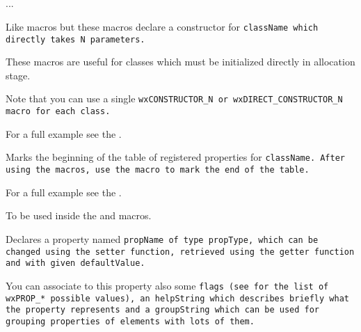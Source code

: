 \\
\\
\\
\\
...\\

Like  macros but these macros declare a constructor
for \tt{className} which directly takes \tt{N} parameters.

These macros are useful for classes which must be initialized directly in allocation stage.

Note that you can use a single \tt{wxCONSTRUCTOR\_N} or \tt{wxDIRECT\_CONSTRUCTOR\_N} macro
for each class.

For a full example see the .


\label{wxbeginpropertiestable}


Marks the beginning of the table of registered properties for \tt{className}.
After using the  macros, use the
 macro 
to mark the end of the table.

For a full example see the .


\label{wxproperty}


To be used inside the 
and  macros.

Declares a property named \tt{propName} of type \tt{propType}, which can be
changed using the \tt{setter} function, retrieved using the \tt{getter} function
and with given \tt{defaultValue}.

You can associate to this property also some \tt{flags} (see 
for the list of \tt{wxPROP_*} possible values), an \tt{helpString} which describes briefly what
the property represents and a \tt{groupString} which can be used for grouping properties of elements
with lots of them.

